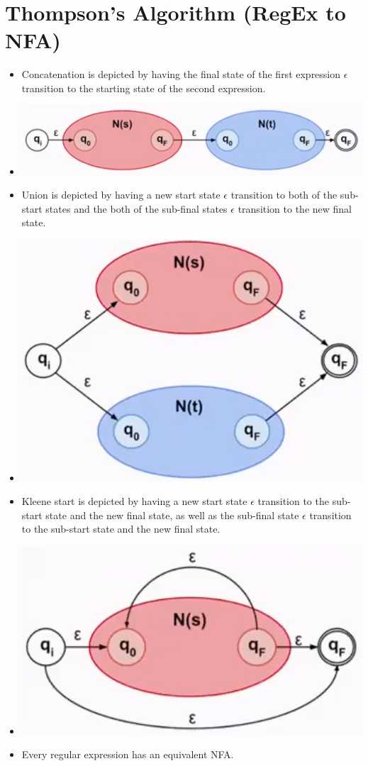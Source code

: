 \section{Thompson's Algorithm (RegEx to NFA)}
\begin{itemize}
    \item Concatenation is depicted by having the final state of the first expression $\epsilon$ transition to the starting state of the second expression.
    \item[] \includegraphics[width=0.9\linewidth]{lecture5/images/thompson-concatenation.png}
    \item Union is depicted by having a new start state $\epsilon$ transition to both of the sub-start states and the both of the sub-final states $\epsilon$ transition to the new final state.
    \item[] \includegraphics[width=0.6\linewidth]{lecture5/images/thompson-union.png}
    \item Kleene start is depicted by having a new start state $\epsilon$ transition to the sub-start state and the new final state, as well as the sub-final state $\epsilon$ transition to the sub-start state and the new final state.
    \item[] \includegraphics[width=0.6\linewidth]{lecture5/images/thompson-kleene.png}
    \item Every regular expression has an equivalent NFA.
\end{itemize}

